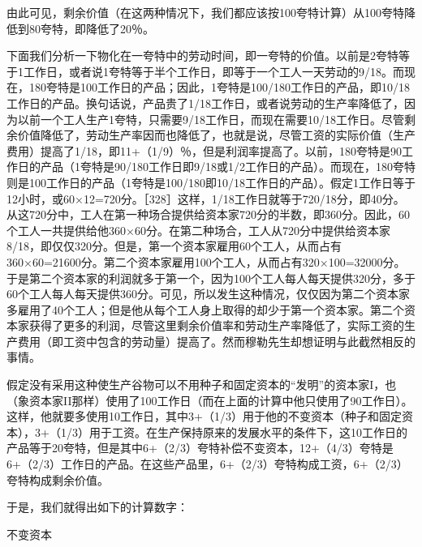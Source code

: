 \todo{}

由此可见，剩余价值（在这两种情况下，我们都应该按100夸特计算）从100夸特降低到80夸特，即降低了20％。

\todo{}

下面我们分析一下物化在一夸特中的劳动时间，即一夸特的价值。以前是2夸特等于1工作日，或者说1夸特等于半个工作日，即等于一个工人一天劳动的9/18。而现在，180夸特是100工作日的产品；因此，1夸特是100/180工作日的产品，即10/18工作日的产品。换句话说，产品贵了1/18工作日，或者说劳动的生产率降低了，因为以前一个工人生产1夸特，只需要9/18工作日，而现在需要10/18工作日。尽管剩余价值降低了，劳动生产率因而也降低了，也就是说，尽管工资的实际价值（生产费用）提高了1/18，即11+（1/9）％，但是利润率提高了。以前，180夸特是90工作日的产品（1夸特是90/180工作日即9/18或1/2工作日的产品）。而现在，180夸特则是100工作日的产品（1夸特是100/180即10/18工作日的产品）。假定1工作日等于12小时，或60×12=720分。［328］这样，1/18工作日就等于720/18分，即40分。从这720分中，工人在第一种场合提供给资本家720分的半数，即360分。因此，60个工人一共提供给他360×60分。在第二种场合，工人从720分中提供给资本家8/18，即仅仅320分。但是，第一个资本家雇用60个工人，从而占有360×60=21600分。第二个资本家雇用100个工人，从而占有320×100=32000分。于是第二个资本家的利润就多于第一个，因为100个工人每人每天提供320分，多于60个工人每人每天提供360分。可见，所以发生这种情况，仅仅因为第二个资本家多雇用了40个工人；但是他从每个工人身上取得的却少于第一个资本家。第二个资本家获得了更多的利润，尽管这里剩余价值率和劳动生产率降低了，实际工资的生产费用（即工资中包含的劳动量）提高了。然而穆勒先生却想证明与此截然相反的事情。

假定没有采用这种使生产谷物可以不用种子和固定资本的“发明”的资本家I，也（象资本家II那样）使用了100工作日（而在上面的计算中他只使用了90工作日）。这样，他就要多使用10工作日，其中3+（1/3）用于他的不变资本（种子和固定资本），3+（1/3）用于工资。在生产保持原来的发展水平的条件下，这10工作日的产品等于20夸特，但是其中6+（2/3）夸特补偿不变资本，12+（4/3）夸特是6+（2/3）工作日的产品。在这些产品里，6+（2/3）夸特构成工资，6+（2/3）夸特构成剩余价值。

于是，我们就得出如下的计算数字：

不变资本

